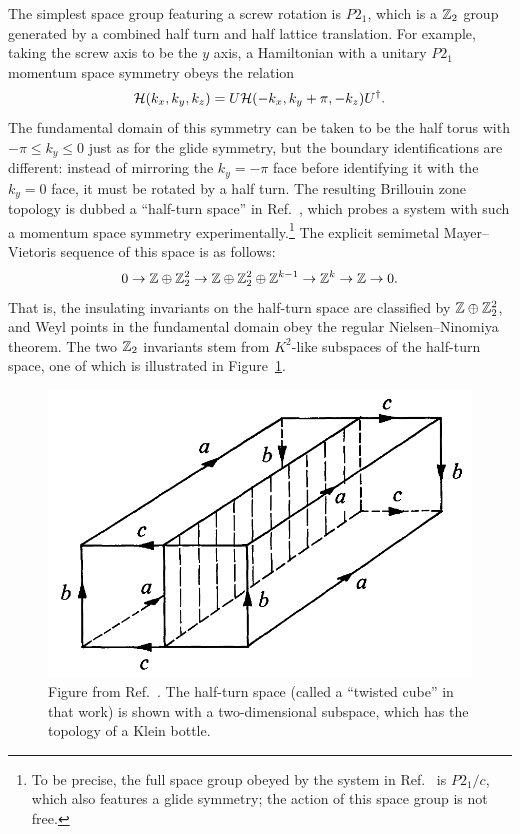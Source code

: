 The simplest space group featuring a screw rotation is $P2_1$, which is a $\mathbb{Z}_2$ group generated by a combined half turn and half lattice translation. For example, taking the screw axis to be the $y$ axis, a Hamiltonian with a unitary $P2_1$ momentum space symmetry obeys the relation
\begin{equation*}
	\mathcal{H}(k_x, k_y, k_z) = U\mathcal{H}(-k_x, k_y+\pi, -k_z)U^\dag.
\end{equation*}
The fundamental domain of this symmetry can be taken to be the half torus with $-\pi\leq k_y\leq0$ just as for the glide symmetry, but the boundary identifications are different: instead of mirroring the $k_y=-\pi$ face before identifying it with the $k_y=0$ face, it must be rotated by a half turn. The resulting Brillouin zone topology is dubbed a ``half-turn space'' in Ref.~\cite{Zhu_acoustic-Klein-halfturn}, which probes a system with such a momentum space symmetry experimentally.\footnote{
	To be precise, the full space group obeyed by the system in Ref.~\cite{Zhu_acoustic-Klein-halfturn} is $P2_1/c$, which also features a glide symmetry; the action of this space group is not free.}
The explicit semimetal Mayer--Vietoris sequence of this space is as follows:
\begin{equation}
	0 \to \mathbb{Z}\oplus\mathbb{Z}_2^2 \to \mathbb{Z}\oplus\mathbb{Z}_2^2\oplus\mathbb{Z}^{k-1} \to \mathbb{Z}^k \to \mathbb{Z} \to 0.
\end{equation}
That is, the insulating invariants on the half-turn space are classified by $\mathbb{Z}\oplus\mathbb{Z}_2^2$, and Weyl points in the fundamental domain obey the regular Nielsen--Ninomiya theorem. The two $\mathbb{Z}_2$ invariants stem from $K^2$-like subspaces of the half-turn space, one of which is illustrated in Figure~\ref{fig:Halfturn-K2}.
\begin{figure}[htb!]
	\centering
	\includegraphics[width=.6\linewidth]{Images/Halfturn-K2}
	\caption{Figure from Ref.~\cite{Woll_One-sided}. The half-turn space (called a ``twisted cube'' in that work) is shown with a two-dimensional subspace, which has the topology of a Klein bottle.}
	\label{fig:Halfturn-K2}
\end{figure}

